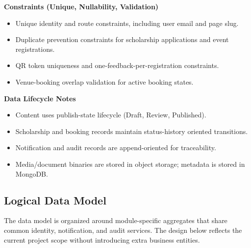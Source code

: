 \documentclass[12pt,a4paper]{article}
\begin{document}
\textbf{Constraints (Unique, Nullability, Validation)}
\begin{itemize}[nosep]
\item Unique identity and route constraints, including user email and page slug.
\item Duplicate prevention constraints for scholarship applications and event registrations.
\item QR token uniqueness and one-feedback-per-registration constraints.
\item Venue-booking overlap validation for active booking states.
\end{itemize}

\textbf{Data Lifecycle Notes}
\begin{itemize}[nosep]
\item Content uses publish-state lifecycle (Draft, Review, Published).
\item Scholarship and booking records maintain status-history oriented transitions.
\item Notification and audit records are append-oriented for traceability.
\item Media/document binaries are stored in object storage; metadata is stored in MongoDB.
\end{itemize}

\subsection{Logical Data Model}
The data model is organized around module-specific aggregates that share common identity, notification, and audit services. The design below reflects the current project scope without introducing extra business entities.
\end{document}
